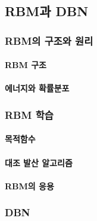 \documentclass [12pt] {oblivoir}
\let\oldsubsubsection=\subsubsection
\renewcommand{\subsubsection}
{
  \filbreak
  \oldsubsubsection
}
\begin{document}
\vspace{3mm}

\subsection{RBM과 DBN}

\subsubsection{RBM의 구조와 원리}

\paragraph*{RBM 구조}\mbox{}

\vspace{3mm}

\paragraph*{에너지와 확률분포}\mbox{}

\vspace{3mm}

\subsubsection{RBM 학습}

\paragraph*{목적함수}\mbox{}

\vspace{3mm}

\paragraph*{대조 발산 알고리즘}\mbox{}

\vspace{3mm}

\paragraph*{RBM의 응용}\mbox{}

\vspace{3mm}

\subsubsection{DBN}
\end{document}
